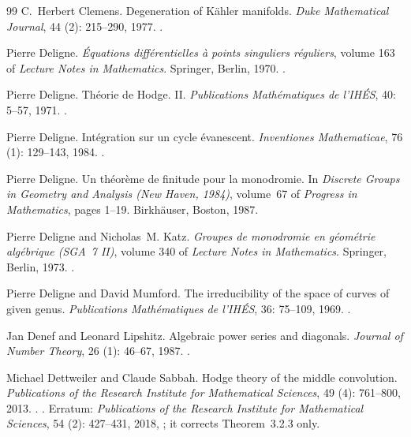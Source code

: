 \documentclass[11pt]{amsart}
\theoremstyle{definition}
\theoremstyle{remark}
\numberwithin{equation}{section}
\begin{document}
\begin{thebibliography}{99}
C.~Herbert Clemens.
\newblock Degeneration of {K}{\"a}hler manifolds.
\newblock \emph{Duke Mathematical Journal}, 44 (2): 215--290,
  1977.
\newblock {}.

Pierre Deligne.
\newblock \emph{{\'E}quations diff{\'e}rentielles {\`a} points singuliers
  r{\'e}guliers}, volume 163 of \emph{Lecture Notes in Mathematics}.
\newblock Springer, Berlin, 1970.
\newblock {}.

Pierre Deligne.
\newblock Th{\'e}orie de {H}odge. {II}.
\newblock \emph{Publications Math{\'e}matiques de l'IH{\'E}S}, 40:
  5--57, 1971.
\newblock {}.

Pierre Deligne.
\newblock Int{\'e}gration sur un cycle {\'e}vanescent.
\newblock \emph{Inventiones Mathematicae}, 76 (1): 129--143,
  1984.
\newblock {}.

Pierre Deligne.
\newblock Un th{\'e}or{\`e}me de finitude pour la monodromie.
\newblock In \emph{Discrete Groups in Geometry and Analysis (New Haven, 1984)},
  volume~67 of \emph{Progress in Mathematics}, pages 1--19. Birkh{\"a}user,
  Boston, 1987.

Pierre Deligne and Nicholas~M. Katz.
\newblock \emph{Groupes de monodromie en g{\'e}om{\'e}trie alg{\'e}brique
  ({SGA}~7 {II})}, volume 340 of \emph{Lecture Notes in Mathematics}.
\newblock Springer, Berlin, 1973.
\newblock {}.

Pierre Deligne and David Mumford.
\newblock The irreducibility of the space of curves of given genus.
\newblock \emph{Publications Math{\'e}matiques de l'IH{\'E}S}, 36:
  75--109, 1969.
\newblock {}.

Jan Denef and Leonard Lipshitz.
\newblock Algebraic power series and diagonals.
\newblock \emph{Journal of Number Theory}, 26 (1): 46--67,
  1987.
\newblock {}.

Michael Dettweiler and Claude Sabbah.
\newblock Hodge theory of the middle convolution.
\newblock \emph{Publications of the Research Institute for Mathematical
	Sciences}, 49 (4): 761--800, 2013.
\newblock {}.
\newblock {}.
\newblock Erratum: \emph{Publications of the Research Institute for
	Mathematical Sciences}, 54 (2): 427--431, 2018,
; it corrects Theorem~3.2.3 only.


\end{thebibliography}
\end{document}
